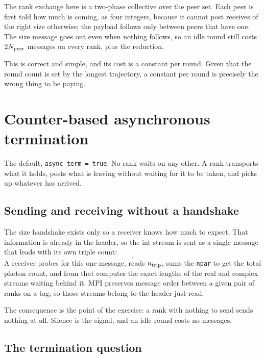 \documentclass[11pt]{article}
\begin{document}
The rank exchange here is a two-phase collective over the peer set. Each peer is first told
how much is coming, as four integers, because it cannot post receives of the right size
otherwise; the payload follows only between peers that have one. The size message goes out
even when nothing follows, so an idle round still costs $2 N_{\rm peer}$ messages on every
rank, plus the reduction.

This is correct and simple, and its cost is a constant per round. Given that the round
count is set by the longest trajectory, a constant per round is precisely the wrong thing
to be paying.

\section{Counter-based asynchronous termination}
\label{sec:async}

The default, \texttt{async\_term = true}. No rank waits on any other. A rank transports
what it holds, posts what is leaving without waiting for it to be taken, and picks up
whatever has arrived.

\subsection{Sending and receiving without a handshake}

The size handshake exists only so a receiver knows how much to expect. That information is
already in the header, so the int stream is sent as a single message that leads with its
own triple count:
\begin{equation}
  [\,n_{\rm trip},\ (\texttt{lid},\texttt{bufid},\texttt{npar})^{n_{\rm trip}},\
  \text{int payload}\,] .
  \label{eq:msg}
\end{equation}
A receiver probes for this one message, reads $n_{\rm trip}$, sums the \texttt{npar} to get
the total photon count, and from that computes the exact lengths of the real and complex
streams waiting behind it. MPI preserves message order between a given pair of ranks on a
tag, so those streams belong to the header just read.

The consequence is the point of the exercise: a rank with nothing to send sends nothing at
all. Silence is the signal, and an idle round costs no messages.

\subsection{The termination question}
\end{document}
